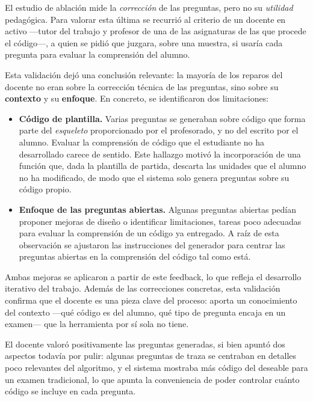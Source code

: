 El estudio de ablación mide la \emph{corrección} de las preguntas, pero no su
\emph{utilidad} pedagógica. Para valorar esta última se recurrió al criterio de
un docente en activo ---tutor del trabajo y profesor de una de las asignaturas
de las que procede el código---, a quien se pidió que juzgara, sobre una
muestra, si usaría cada pregunta para evaluar la comprensión del alumno.

Esta validación dejó una conclusión relevante: la mayoría de los reparos del
docente no eran sobre la corrección técnica de las preguntas, sino sobre su
\textbf{contexto} y su \textbf{enfoque}. En
concreto, se identificaron dos limitaciones:

\begin{itemize}
  \item \textbf{Código de plantilla.} Varias preguntas se generaban sobre
        código que forma parte del \emph{esqueleto} proporcionado por el
        profesorado, y no del escrito por el alumno. Evaluar la comprensión de
        código que el estudiante no ha desarrollado carece de sentido. Este
        hallazgo motivó la incorporación de una función que, dada la plantilla
        de partida, descarta las unidades que el alumno no ha modificado, de
        modo que el sistema solo genera preguntas sobre su código propio.
  \item \textbf{Enfoque de las preguntas abiertas.} Algunas preguntas abiertas
        pedían proponer mejoras de diseño o identificar limitaciones, tareas
        poco adecuadas para evaluar la comprensión de un código ya entregado.
        A raíz de esta observación se ajustaron las instrucciones del generador
        para centrar las preguntas abiertas en la comprensión del código tal
        como está.
\end{itemize}

Ambas mejoras se aplicaron a partir de este feedback, lo que refleja el
desarrollo iterativo del trabajo. Además de las correcciones concretas, esta
validación confirma que el docente es una pieza clave del proceso: aporta un
conocimiento del contexto ---qué código es del alumno, qué tipo de pregunta
encaja en un examen--- que la herramienta por sí sola no tiene.

El docente valoró positivamente las preguntas generadas, si bien apuntó dos
aspectos todavía por pulir: algunas preguntas de traza se centraban en detalles
poco relevantes del algoritmo, y el sistema mostraba más código del deseable
para un examen tradicional, lo que apunta la conveniencia de poder controlar
cuánto código se incluye en cada pregunta.


